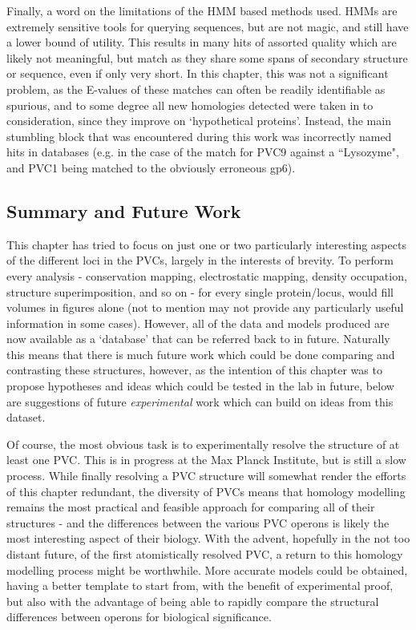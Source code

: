 Finally, a word on the limitations of the HMM based methods used. HMMs are extremely sensitive tools for querying sequences, but are not magic, and still have a lower bound of utility. This results in many hits of assorted quality which are likely not meaningful, but match as they share some spans of secondary structure or sequence, even if only very short. In this chapter, this was not a significant problem, as the E-values of these matches can often be readily identifiable as spurious, and to some degree all new homologies detected were taken in to consideration, since they improve on `hypothetical proteins'. Instead, the main stumbling block that was encountered during this work was incorrectly named hits in databases (e.g. in the case of the match for PVC9 against a ``Lysozyme", and PVC1 being matched to the obviously erroneous gp6).

\subsection{Summary and Future Work}
This chapter has tried to focus on just one or two particularly interesting aspects of the different loci in the PVCs, largely in the interests of brevity. To perform every analysis - conservation mapping, electrostatic mapping, density occupation, structure superimposition, and so on - for every single protein/locus, would fill volumes in figures alone (not to mention may not provide any particularly useful information in some cases). However, all of the data and models produced are now available as a `database' that can be referred back to in future. Naturally this means that there is much future work which could be done comparing and contrasting these structures, however, as the intention of this chapter was to propose hypotheses and ideas which could be tested in the lab in future, below are suggestions of future \emph{experimental} work which can build on ideas from this dataset.

Of course, the most obvious task is to experimentally resolve the structure of at least one PVC. This is in progress at the Max Planck Institute, but is still a slow process. While finally resolving a PVC structure will somewhat render the efforts of this chapter redundant, the diversity of PVCs means that homology modelling remains the most practical and feasible approach for comparing all of their structures - and the differences between the various PVC operons is likely the most interesting aspect of their biology. With the advent, hopefully in the not too distant future, of the first atomistically resolved PVC, a return to this homology modelling process might be worthwhile. More accurate models could be obtained, having a better template to start from, with the benefit of experimental proof, but also with the advantage of being able to rapidly compare the structural differences between operons for biological significance.

